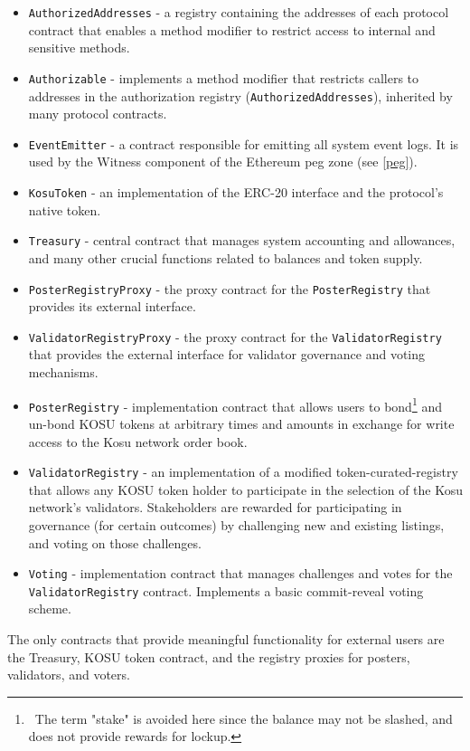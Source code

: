 \documentclass[10pt]{article}
\begin{document}
\begin{itemize}
  \item \texttt{AuthorizedAddresses} - a registry containing the addresses of each protocol contract that enables a method modifier to restrict access to internal and sensitive methods.
  \item \texttt{Authorizable} - implements a method modifier that restricts callers to addresses in the authorization registry (\texttt{AuthorizedAddresses}), inherited by many protocol contracts.
  \item \texttt{EventEmitter} - a contract responsible for emitting all system event logs. It is used by the Witness component of the Ethereum peg zone (see \ref{peg}).
  \item \texttt{KosuToken} - an implementation of the ERC-20 interface and the protocol's native token.
  \item \texttt{Treasury} - central contract that manages system accounting and allowances, and many other crucial functions related to balances and token supply.
  \item \texttt{PosterRegistryProxy} - the proxy contract for the \texttt{PosterRegistry} that provides its external interface.
  \item \texttt{ValidatorRegistryProxy} - the proxy contract for the \texttt{ValidatorRegistry} that provides the external interface for validator governance and voting mechanisms.
  \item \texttt{PosterRegistry} - implementation contract that allows users to bond\footnote{\ The term "stake" is avoided here since the balance may not be slashed, and does not provide rewards for lockup.} and un-bond KOSU tokens at arbitrary times and amounts in exchange for write access to the Kosu network order book. 
  \item \texttt{ValidatorRegistry} - an implementation of a modified token-curated-registry\cite{tcr-1} that allows any KOSU token holder to participate in the selection of the Kosu network's validators. Stakeholders are rewarded for participating in governance (for certain outcomes) by challenging new and existing listings, and voting on those challenges. 
  \item \texttt{Voting} - implementation contract that manages challenges and votes for the \texttt{ValidatorRegistry} contract. Implements a basic commit-reveal voting scheme.
\end{itemize}

The only contracts that provide meaningful functionality for external users are the Treasury, KOSU token contract, and the registry proxies for posters, validators, and voters.
\end{document}
